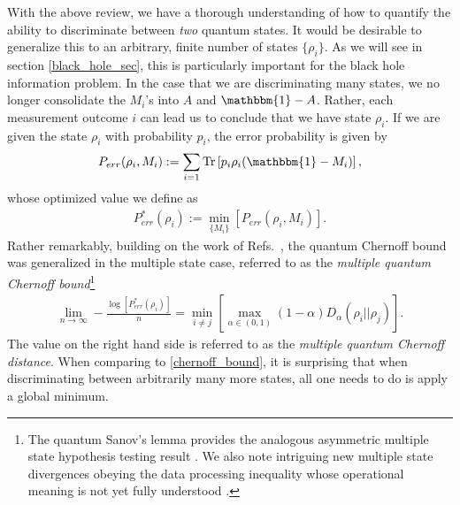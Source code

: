 \documentclass[a4paper,11pt]{article}
\newcommand{\Tr}{\text{Tr}}
\begin{document}
With the above review, we have a thorough understanding of how to quantify the ability to discriminate between \textit{two} quantum states. It would be desirable to generalize this to an arbitrary, finite number of states $\{ \rho_i\}$. As we will see in section \ref{black_hole_sec}, this is particularly important for the black hole information problem. In the case that we are discriminating many states, we no longer consolidate the $M_i$'s into $A$ and $\mathbbm{1} - A$. Rather, each measurement outcome $i$ can lead us to conclude that we have state $\rho_i$. If we are given the state $\rho_i$ with probability $p_i$, the error probability is given by
\begin{align}
    P_{err}(\rho_i,M_i) := \sum_{i = 1}\Tr\left[p_i \rho_i(\mathbbm{1} -M_i) \right],
\end{align}
whose optimized value we define as
\begin{align}
    P_{err}^*(\rho_i) :=\min_{\{M_i\}}\left[P_{err}(\rho_i,M_i)\right].
\end{align}
Rather remarkably, building on the work of Refs.~\cite{2010JMP....51g2203N, 10.1007/978-3-642-18073-6_1, 2011arXiv1112.1529N,2014JMP....55j2201A}, the quantum Chernoff bound was generalized in the multiple state case, referred to as the \textit{multiple quantum Chernoff bound}\footnote{The quantum Sanov’s lemma provides the analogous asymmetric multiple state hypothesis testing result \cite{2002JPhA...3510759H,2005CMaPh.260..659B}. We also note intriguing new multiple state divergences obeying the data processing inequality whose operational meaning is not yet fully understood \cite{2021arXiv210309893F}.} \cite{2015arXiv150806624L}
\begin{align}
    \lim_{n\rightarrow \infty}-\frac{\log\left[ P_{err}^*(\rho_i) \right]}{n} = \min_{i\neq j}\left[\max_{\alpha \in (0,1)}(1-\alpha )D_{\alpha}(\rho_i||\rho_j)\right].
    \label{mult_chernoff}
\end{align}
The value on the right hand side is referred to as the \textit{multiple quantum Chernoff distance}. When comparing to \eqref{chernoff_bound}, it is surprising that when discriminating between arbitrarily many more states, all one needs to do is apply a global minimum.
\end{document}

